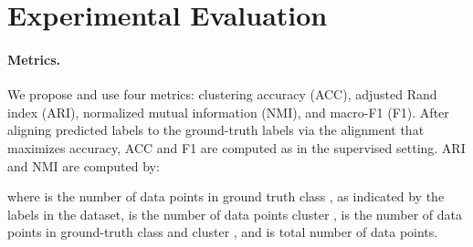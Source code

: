 \documentclass[wcp]{jmlr}
\begin{document}
\section{Experimental Evaluation} \label{sec:results}
\paragraph{Metrics.}
We propose and use four metrics: clustering accuracy (ACC), adjusted Rand index (ARI), normalized mutual information (NMI), and macro-F1 (F1). After aligning predicted labels to the ground-truth labels via the alignment that maximizes accuracy, ACC and F1 are computed as in the supervised setting. ARI and NMI are computed by:

where  is the number of data points in ground truth class , as indicated by the labels in the dataset,  is the number of data points cluster ,  is the number of data points in ground-truth class  and cluster , and  is total number of data points.
\end{document}
